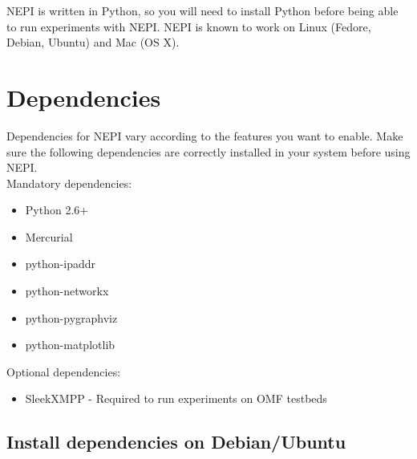 %
%
%
%
%
%

NEPI is written in Python, so you will need to install Python before 
being able to run experiments with NEPI. 
NEPI is known to work on Linux (Fedore, Debian, Ubuntu) and Mac (OS X).

\section{Dependencies}

Dependencies for NEPI vary according to the features you want to enable.
Make sure the following dependencies are correctly installed in your system
before using NEPI. \\

Mandatory dependencies:
\begin{itemize}
    \item Python 2.6+
    \item Mercurial
    \item python-ipaddr
    \item python-networkx
    \item python-pygraphviz
    \item python-matplotlib 
\end{itemize}

Optional dependencies:
\begin{itemize}
    \item SleekXMPP - Required to run experiments on OMF testbeds
\end{itemize}

\subsection{Install dependencies on Debian/Ubuntu}

